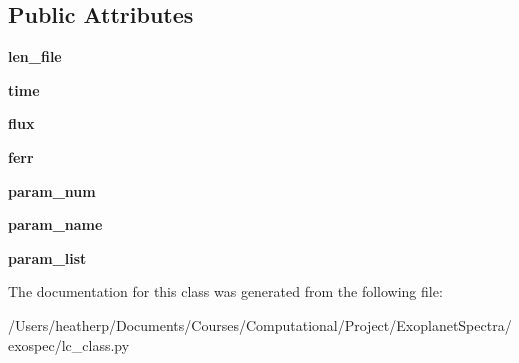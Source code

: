 \subsection*{Public Attributes}
\begin{DoxyCompactItemize}
\item 
\mbox{\label{classexospec_1_1lc__class_1_1_light_curve_data_adec28cf813c15d7c75f402d7bb51804d}} 
{\bfseries len\+\_\+file}
\item 
\mbox{\label{classexospec_1_1lc__class_1_1_light_curve_data_a118772717cee974c8f56534c1c4fa9bd}} 
{\bfseries time}
\item 
\mbox{\label{classexospec_1_1lc__class_1_1_light_curve_data_a8f871e916a7b560139181bf8cb9d0784}} 
{\bfseries flux}
\item 
\mbox{\label{classexospec_1_1lc__class_1_1_light_curve_data_adcc1b218150a87e12fd77a65103f4322}} 
{\bfseries ferr}
\item 
\mbox{\label{classexospec_1_1lc__class_1_1_light_curve_data_a0e0ef1bb47bea5bf61b47493a49eb2c1}} 
{\bfseries param\+\_\+num}
\item 
\mbox{\label{classexospec_1_1lc__class_1_1_light_curve_data_a2b6db36191285094a8456aba0f339b4a}} 
{\bfseries param\+\_\+name}
\item 
\mbox{\label{classexospec_1_1lc__class_1_1_light_curve_data_a0d1f6258313a1e9ceb9bbe8ddf59eb76}} 
{\bfseries param\+\_\+list}
\end{DoxyCompactItemize}


The documentation for this class was generated from the following file\+:\begin{DoxyCompactItemize}
\item 
/\+Users/heatherp/\+Documents/\+Courses/\+Computational/\+Project/\+Exoplanet\+Spectra/exospec/lc\+\_\+class.\+py\end{DoxyCompactItemize}
